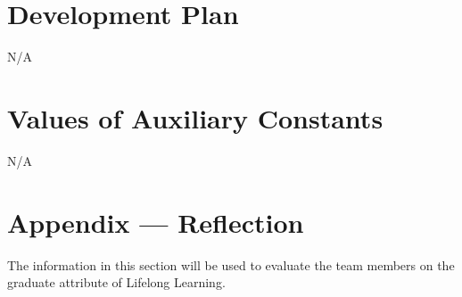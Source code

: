 \documentclass[12pt]{article}
\begin{document}
\section{Development Plan}

N/A

\section{Values of Auxiliary Constants}
N/A

\newpage





\newpage
\section*{Appendix --- Reflection}


The information in this section will be used to evaluate the team members on the
graduate attribute of Lifelong Learning.  


\end{document}
